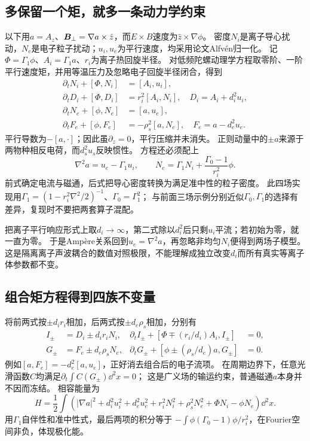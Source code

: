 \documentclass[UTF8,a4paper,11pt,openany,fontset=fandol]{ctexbook}
\begin{document}
\subsection{多保留一个矩，就多一条动力学约束}
以下用$a=A_z$、$\bm{B}_\perp=\nabla a\times\hat z$，而$E\times B$速度为$\hat z\times\nabla\phi$。
密度$N_i$是离子导心扰动，$N_e$是电子粒子扰动；$u_i,u_e$为平行速度，均采用论文Alfvén归一化。
记$\Phi=\Gamma_1\phi$、$A_i=\Gamma_1a$、$r_i$为离子热回旋半径。
对低频陀螺动理学方程取零阶、一阶平行速度矩，并用等温压力及忽略电子回旋半径闭合，得到
\begin{align}
 \partial_tN_i+[\Phi,N_i]&=[A_i,u_i],\\
 \partial_tD_i+[\Phi,D_i]&=r_i^2[A_i,N_i],\quad D_i=A_i+d_i^2u_i,\\
 \partial_tN_e+[\phi,N_e]&=[a,u_e],\\
 \partial_tF_e+[\phi,F_e]&=-\rho_s^2[a,N_e],\quad F_e=a-d_e^2u_e.
 \label{eq:gyrofour}
\end{align}
平行导数为$-[a,\cdot]$；因此虽$\partial_z=0$，平行压缩并未消失。
正则动量中的$\pm a$来源于两物种相反电荷，而$d_s^2u_s$反映惯性。
方程还必须配上
\begin{equation}
 \nabla^2a=u_e-\Gamma_1u_i,\qquad
 N_e=\Gamma_1N_i+\frac{\Gamma_0-1}{r_i^2}\phi.
 \label{eq:gyrofourconstraints}
\end{equation}
前式确定电流与磁通，后式把导心密度转换为满足准中性的粒子密度。
此四场实现用$\Gamma_1=(1-r_i^2\nabla^2/2)^{-1}$、$\Gamma_0=\Gamma_1^2$；
与前面三场示例分别近似$\Gamma_0,\Gamma_1$的选择有差异，复现时不要把两套算子混配。\citep{F672,E475}

把离子平行响应形式上取$d_i\to\infty$，第二式除以$d_i^2$后只剩$u_i$平流；若初始为零，就一直为零。
于是Ampère关系回到$u_e=\nabla^2a$，再忽略非均匀$N_i$便得到两场子模型。
这是隔离离子声波耦合的数值对照极限，不能理解成独立改变$d_i$而所有真实等离子体参数都不变。

\subsection{组合矩方程得到四族不变量}
将前两式按$\pm d_ir_i$相加，后两式按$\pm d_e\rho_s$相加，分别有
\begin{align}
 I_\pm&=D_i\pm d_ir_iN_i,&
 \partial_tI_\pm+[\Phi\mp(r_i/d_i)A_i,I_\pm]&=0,\\
 G_\pm&=F_e\pm d_e\rho_sN_e,&
 \partial_tG_\pm+[\phi\pm(\rho_s/d_e)a,G_\pm]&=0.
\end{align}
例如$[a,F_e]=-d_e^2[a,u_e]$，正好消去组合后的电子流项。
在周期边界下，任意光滑函数$C$均满足$\partial_t\int C(G_\pm)\dd^2x=0$；
这是广义场的输运约束，普通磁通$a$本身并不因而冻结。
相容能量为
\begin{equation}
 H=\frac12\int\left(|\nabla a|^2+d_i^2u_i^2+d_e^2u_e^2
 +r_i^2N_i^2+\rho_s^2N_e^2+\Phi N_i-\phi N_e\right)\dd^2x.
\end{equation}
用$\Gamma_1$自伴性和准中性式，最后两项的积分等于
$-\int\phi(\Gamma_0-1)\phi/r_i^2$，在Fourier空间非负，体现极化能。
\end{document}
